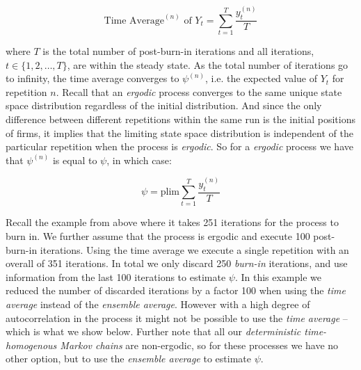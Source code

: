 \documentclass[preprint, 12pt]{elsarticle}
\begin{document}
\begin{equation}
\mbox{Time Average}^{(n)} \mbox{ of } Y_t = \sum\limits_{t = 1}^T {\frac{ y_t^{(n)} }{ T }}
\end{equation}

where $T$ is the total number of post-burn-in iterations and all iterations, $t \in \{1,2, \dots, T\}$, are within the steady state. As the total number of iterations go to infinity, the time average converges to $\psi^{(n)}$, i.e. the expected value of $Y_t$ for repetition $n$. Recall that an \emph{ergodic} process converges to the same unique state space distribution regardless of the initial distribution. And since the only difference between different repetitions within the same run is the initial positions of firms, it implies that the limiting state space distribution is independent of the particular repetition when the process is \emph{ergodic}. So for a \emph{ergodic} process we have that $\psi^{(n)}$ is equal to $\psi$, in which case:

$$\psi = \mbox{plim} \sum\limits_{t = 1}^T {\frac{ y_t^{(n)} }{ T }}$$

Recall the example from above where it takes 251 iterations for the process to burn in. We further assume that the process is ergodic and execute 100 post-burn-in iterations. Using the time average we execute a single repetition with an overall of 351 iterations. In total we only discard 250 \emph{burn-in} iterations, and use information from the last 100 iterations to estimate $\psi$. In this example we reduced the number of discarded iterations by a factor 100 when using the \emph{time average} instead of the \emph{ensemble average}. However with a high degree of autocorrelation in the process it might not be possible to use the \emph{time average} -- which is what we show below. Further note that all our \emph{deterministic time-homogenous Markov chains} are non-ergodic, so for these processes we have no other option, but to use the \emph{ensemble average} to estimate $\psi$.
\end{document}
